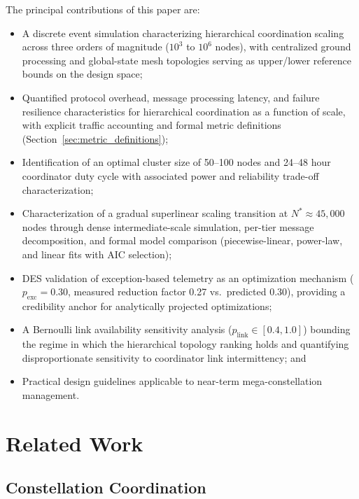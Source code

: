 \documentclass[journal]{IEEEtran}
\begin{document}
The principal contributions of this paper are:
\begin{itemize}
    \item A discrete event simulation characterizing hierarchical coordination scaling across three orders of magnitude ($10^3$ to $10^6$ nodes), with centralized ground processing and global-state mesh topologies serving as upper/lower reference bounds on the design space;
    \item Quantified protocol overhead, message processing latency, and failure resilience characteristics for hierarchical coordination as a function of scale, with explicit traffic accounting and formal metric definitions (Section~\ref{sec:metric_definitions});
    \item Identification of an optimal cluster size of 50--100 nodes and 24--48 hour coordinator duty cycle with associated power and reliability trade-off characterization;
    \item Characterization of a gradual superlinear scaling transition at $N^* \approx 45{,}000$ nodes through dense intermediate-scale simulation, per-tier message decomposition, and formal model comparison (piecewise-linear, power-law, and linear fits with AIC selection);
    \item DES validation of exception-based telemetry as an optimization mechanism ($p_{\text{exc}} = 0.30$, measured reduction factor 0.27 vs.\ predicted 0.30), providing a credibility anchor for analytically projected optimizations;
    \item A Bernoulli link availability sensitivity analysis ($p_{\text{link}} \in [0.4, 1.0]$) bounding the regime in which the hierarchical topology ranking holds and quantifying disproportionate sensitivity to coordinator link intermittency; and
    \item Practical design guidelines applicable to near-term mega-constellation management.
\end{itemize}


\section{Related Work}

\subsection{Constellation Coordination}
\end{document}
